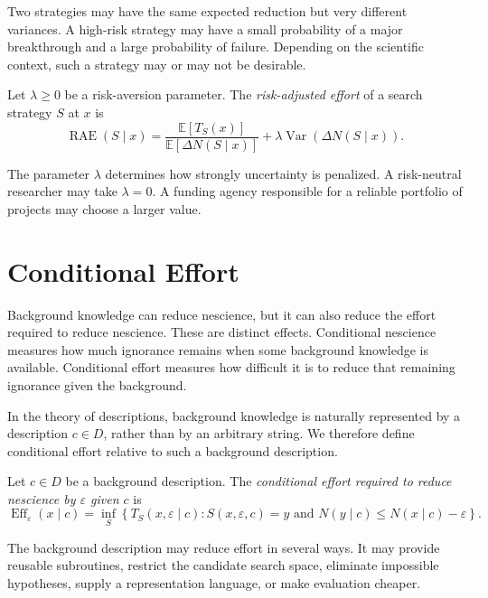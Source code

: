 Two strategies may have the same expected reduction but very different variances. A high-risk strategy may have a small probability of a major breakthrough and a large probability of failure. Depending on the scientific context, such a strategy may or may not be desirable.

\begin{definition}
Let \(\lambda\geq 0\) be a risk-aversion parameter. The \emph{risk-adjusted effort} of a search strategy \(S\) at \(x\) is
\[
\operatorname{RAE}(S\mid x)
=
\frac{\mathbb{E}[T_S(x)]}{\mathbb{E}[\Delta N(S\mid x)]}
+
\lambda\operatorname{Var}(\Delta N(S\mid x)).
\]
\end{definition}

The parameter \(\lambda\) determines how strongly uncertainty is penalized. A risk-neutral researcher may take \(\lambda=0\). A funding agency responsible for a reliable portfolio of projects may choose a larger value.

\section{Conditional Effort}
\label{sec:conditional_effort}

Background knowledge can reduce nescience, but it can also reduce the effort required to reduce nescience. These are distinct effects. Conditional nescience measures how much ignorance remains when some background knowledge is available. Conditional effort measures how difficult it is to reduce that remaining ignorance given the background.

In the theory of descriptions, background knowledge is naturally represented by a description \(c\in D\), rather than by an arbitrary string. We therefore define conditional effort relative to such a background description.

\begin{definition}
Let \(c\in D\) be a background description. The \emph{conditional effort required to reduce nescience by \(\varepsilon\) given \(c\)} is
\[
\operatorname{Eff}_{\varepsilon}(x\mid c)
=
\inf_S
\left\{
T_S(x,\varepsilon\mid c):
S(x,\varepsilon,c)=y
\text{ and }
N(y\mid c)\leq N(x\mid c)-\varepsilon
\right\}.
\]
\end{definition}

The background description may reduce effort in several ways. It may provide reusable subroutines, restrict the candidate search space, eliminate impossible hypotheses, supply a representation language, or make evaluation cheaper.

